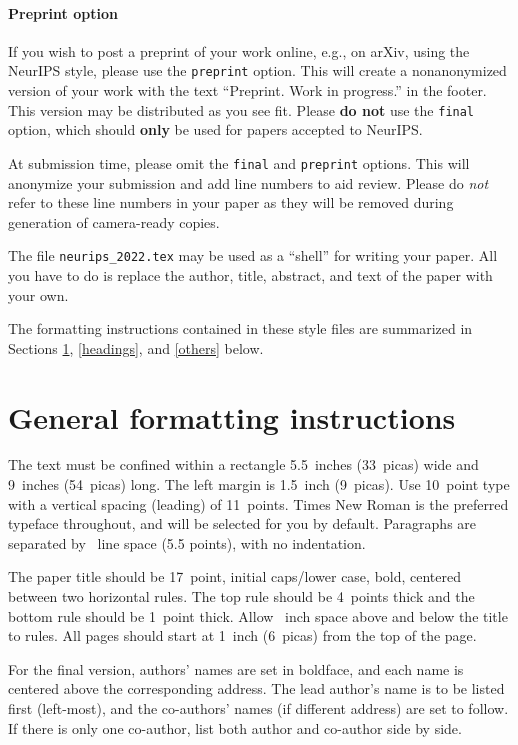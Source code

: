 \documentclass{article}
\begin{document}
\paragraph{Preprint option}
If you wish to post a preprint of your work online, e.g., on arXiv, using the
NeurIPS style, please use the \verb+preprint+ option. This will create a
nonanonymized version of your work with the text ``Preprint. Work in
progress.'' in the footer. This version may be distributed as you see fit.
Please \textbf{do not} use the \verb+final+ option, which should \textbf{only}
be used for papers accepted to NeurIPS.

At submission time, please omit the \verb+final+ and \verb+preprint+ options.
This will anonymize your submission and add line numbers to aid review. Please
do \emph{not} refer to these line numbers in your paper as they will be removed
during generation of camera-ready copies.

The file \verb+neurips_2022.tex+ may be used as a ``shell'' for writing your
paper. All you have to do is replace the author, title, abstract, and text of
the paper with your own.

The formatting instructions contained in these style files are summarized in
Sections \ref{gen_inst}, \ref{headings}, and \ref{others} below.

\section{General formatting instructions}
\label{gen_inst}

The text must be confined within a rectangle 5.5~inches (33~picas) wide and
9~inches (54~picas) long. The left margin is 1.5~inch (9~picas). Use 10~point
type with a vertical spacing (leading) of 11~points. Times New Roman is the
preferred typeface throughout, and will be selected for you by default.
Paragraphs are separated by ~line space (5.5 points), with no
indentation.

The paper title should be 17~point, initial caps/lower case, bold, centered
between two horizontal rules. The top rule should be 4~points thick and the
bottom rule should be 1~point thick. Allow ~inch space above and
below the title to rules. All pages should start at 1~inch (6~picas) from the
top of the page.

For the final version, authors' names are set in boldface, and each name is
centered above the corresponding address. The lead author's name is to be
listed first (left-most), and the co-authors' names (if different address) are
set to follow. If there is only one co-author, list both author and co-author
side by side.
\end{document}
